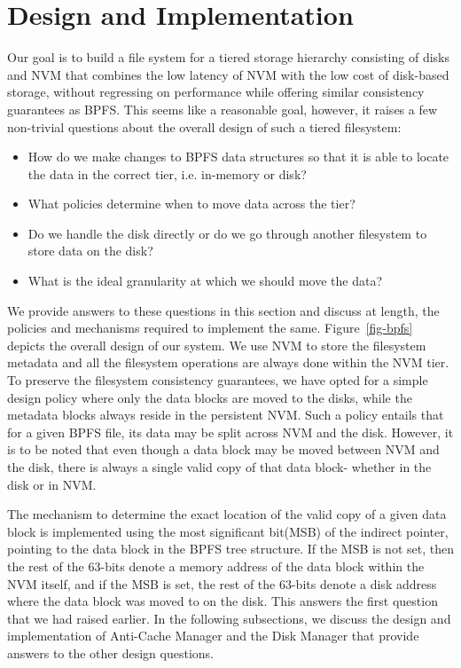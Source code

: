 \section{Design and Implementation}
\label{sec-design}
Our goal is to build a file system for a tiered storage hierarchy consisting of disks and NVM that combines the low latency of NVM with the low cost of disk-based storage, without regressing on performance while offering similar consistency guarantees as BPFS. This seems like a reasonable goal, however, it raises a few non-trivial questions about the overall design of such a tiered filesystem:

\begin{itemize}
\item How do we make changes to BPFS data structures so that it is able to locate the data in the correct tier, i.e. in-memory or disk? \vspace{-0.1in}
\item What policies determine when to move data across the tier? \vspace{-0.1in}
\item Do we handle the disk directly or do we go through another filesystem to store data on the disk? \vspace{-0.1in}
\item What is the ideal granularity at which we should move the data? \vspace{-0.1in}
\end{itemize}

We provide answers to these questions in this section and discuss at length, the policies and mechanisms required to implement the same. Figure~\ref{fig-bpfs} depicts the overall design of our system. We use NVM to store the filesystem metadata and all the filesystem operations are always done within the NVM tier. To preserve the filesystem consistency guarantees, we have opted for a simple design policy where only the data blocks are moved to the disks, while the metadata blocks always reside in the persistent NVM. Such a policy entails that for a given BPFS file, its data may be split across NVM and the disk. However, it is to be noted that even though a data block may be moved between NVM and the disk, there is always a single valid copy of that data block- whether in the disk or in NVM.

The mechanism to determine the exact location of the valid copy of a given data block is implemented using the most significant bit(MSB) of the indirect pointer, pointing to the data block in the BPFS tree structure. If the MSB is not set, then the rest of the 63-bits denote a memory address of the data block within the NVM itself, and if the MSB is set, the rest of the 63-bits denote a disk address where the data block was moved to on the disk. This answers the first question that we had raised earlier. In the following subsections, we discuss the design and implementation of Anti-Cache Manager and the Disk Manager that provide answers to the other design questions.

